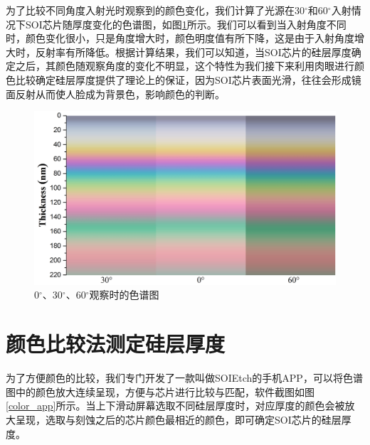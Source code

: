为了比较不同角度入射光时观察到的颜色变化，我们计算了光源在30$^{\circ}$和60$^{\circ}$入射情况下SOI芯片随厚度变化的色谱图，如图\ref{color_compare}所示。我们可以看到当入射角度不同时，颜色变化很小，只是角度增大时，颜色明度值有所下降，这是由于入射角度增大时，反射率有所降低。根据计算结果，我们可以知道，当SOI芯片的硅层厚度确定之后，其颜色随观察角度的变化不明显，这个特性为我们接下来利用肉眼进行颜色比较确定硅层厚度提供了理论上的保证，因为SOI芯片表面光滑，往往会形成镜面反射从而使人脸成为背景色，影响颜色的判断。

\begin{figure}[htb]
	\centering
	\includegraphics[width=14cm]{./Pictures/color_compare.jpg}
	\captionsetup{justification=centering}
	\caption{0$^{\circ}$、30$^{\circ}$、60$^{\circ}$观察时的色谱图}
	\label{color_compare}
\end{figure}

\section{颜色比较法测定硅层厚度}

为了方便颜色的比较，我们专门开发了一款叫做SOIEtch的手机APP，可以将色谱图中的颜色放大连续呈现，方便与芯片进行比较与匹配，软件截图如图\ref{color_app}所示。当上下滑动屏幕选取不同硅层厚度时，对应厚度的颜色会被放大呈现，选取与刻蚀之后的芯片颜色最相近的颜色，即可确定SOI芯片的硅层厚度。

